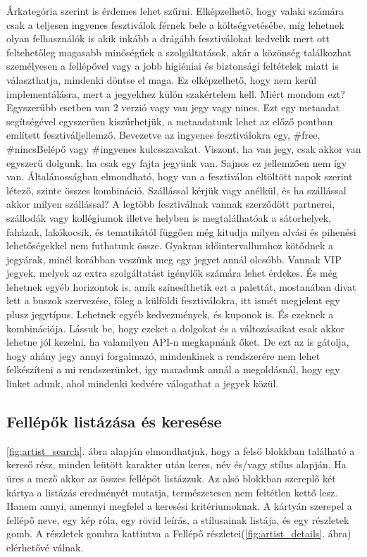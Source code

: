 Árkategória szerint is érdemes lehet szűrni. Elképzelhető, hogy valaki számára csak a teljesen ingyenes fesztiválok férnek bele a költségvetésébe, míg lehetnek olyan felhasználók is akik inkább a drágább fesztiválokat kedvelik mert ott feltehetőleg magasabb minőségűek a szolgáltatások, akár a közönség találkozhat személyesen a fellépővel vagy a jobb higiéniai és biztonsági feltételek miatt is választhatja, mindenki döntse el maga. Ez elképzelhető, hogy nem kerül implementálásra, mert a jegyekhez külön szakértelem kell. Miért mondom ezt? Egyszerűbb esetben van 2 verzió vagy van jegy vagy nincs. Ezt egy metaadat segítségével egyszerűen kiszűrhetjük, a metaadatunk lehet az előző pontban említett fesztiváljellemző. Bevezetve az ingyenes fesztiválokra egy, \#free, \#nincsBelépő vagy \#ingyenes kulcsszavakat. Viszont, ha van jegy, csak akkor van egyszerű dolgunk, ha csak egy fajta jegyünk van. Sajnos ez jellemzően nem így van. Általánosságban elmondható, hogy van a fesztiválon eltöltött napok szerint létező, szinte összes kombináció. Szállással kérjük vagy anélkül, és ha szállással akkor milyen szállással? A legtöbb fesztiválnak vannak szerződött partnerei, szállodák vagy kollégiumok illetve helyben is megtalálhatóak a sátorhelyek, faházak, lakókocsik, és tematikától függően még kitudja milyen alvási és pihenési lehetőségekkel nem futhatunk össze. Gyakran időintervallumhoz kötődnek a jegyárak, minél korábban veszünk meg egy jegyet annál olcsóbb. Vannak VIP jegyek, melyek az extra szolgáltatást igénylők számára lehet érdekes. És még lehetnek egyéb horizontok is, amik színesíthetik ezt a palettát, mostanában divat lett a buszok szervezése, főleg a  külföldi fesztiválokra, itt ismét megjelent egy plusz jegytípus. Lehetnek egyéb kedvezmények, és kuponok is. És ezeknek a kombinációja. Lássuk be, hogy ezeket a dolgokat és a változásaikat csak akkor lehetne jól kezelni, ha valamilyen API-n megkapnánk őket. De ezt az is gátolja, hogy ahány jegy annyi forgalmazó, mindenkinek a rendszerére nem lehet felkészíteni a mi rendszerünket, így maradunk annál a megoldásnál, hogy egy linket adunk, ahol mindenki kedvére válogathat a jegyek közül.

\subsection{Fellépők listázása és keresése}

\ref{fig:artist_search}. ábra alapján elmondhatjuk, hogy a felső blokkban található a kereső rész, minden leütött karakter után keres, név és/vagy stílus alapján. Ha üres a mező akkor az összes fellépőt listázzuk. Az alsó blokkban szereplő két kártya a listázás eredményét mutatja, természetesen nem feltétlen kettő lesz. Hanem annyi, amennyi megfelel a keresési kritériumoknak. A kártyán szerepel a fellépő neve, egy kép róla, egy rövid leírás, a stílusainak listája, és egy részletek gomb. A részletek gombra kattintva a Fellépő részletei(\ref{fig:artist_details}. ábra) elérhetővé válnak.

